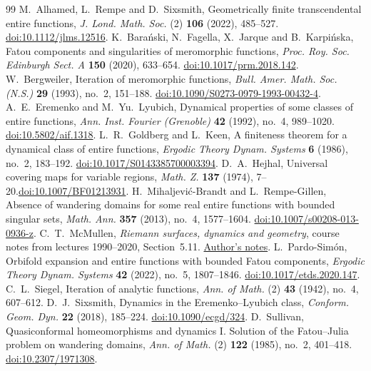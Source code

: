\documentclass[10pt,a4paper]{amsart}
\numberwithin{equation}{section}
\begin{document}
\begin{thebibliography}{99}
 M.~Alhamed, L.~Rempe and D.~Sixsmith, Geometrically finite transcendental entire functions, \emph{J. Lond. Math. Soc.} (2) \textbf{106} (2022), 485--527. \href{https://doi.org/10.1112/jlms.12516}{doi:10.1112/jlms.12516}.
 K.~Bara\'nski, N.~Fagella, X.~Jarque and B.~Karpi\'nska, Fatou components and singularities of meromorphic functions, \emph{Proc. Roy. Soc. Edinburgh Sect. A} \textbf{150} (2020), 633--654. \href{https://doi.org/10.1017/prm.2018.142}{doi:10.1017/prm.2018.142}.
 W.~Bergweiler, Iteration of meromorphic functions, \emph{Bull. Amer. Math. Soc. (N.S.)} \textbf{29} (1993), no.~2, 151--188. \href{https://doi.org/10.1090/S0273-0979-1993-00432-4}{doi:10.1090/S0273-0979-1993-00432-4}.
 A.~E.~Eremenko and M.~Yu.~Lyubich, Dynamical properties of some classes of entire functions, \emph{Ann. Inst. Fourier (Grenoble)} \textbf{42} (1992), no.~4, 989--1020. \href{https://doi.org/10.5802/aif.1318}{doi:10.5802/aif.1318}.
 L.~R.~Goldberg and L.~Keen, A finiteness theorem for a dynamical class of entire functions, \emph{Ergodic Theory Dynam. Systems} \textbf{6} (1986), no.~2, 183--192. \href{https://doi.org/10.1017/S0143385700003394}{doi:10.1017/S0143385700003394}.
 D.~A.~Hejhal, Universal covering maps for variable regions, \emph{Math. Z.} \textbf{137} (1974), 7--20.\newline \href{https://doi.org/10.1007/BF01213931}{doi:10.1007/BF01213931}.
 H.~Mihaljevi\'c-Brandt and L.~Rempe-Gillen, Absence of wandering domains for some real entire functions with bounded singular sets, \emph{Math. Ann.} \textbf{357} (2013), no.~4, 1577--1604. \href{https://doi.org/10.1007/s00208-013-0936-z}{doi:10.1007/s00208-013-0936-z}.
 C.~T.~McMullen, \emph{Riemann surfaces, dynamics and geometry}, course notes from lectures 1990--2020, Section~5.11. \href{https://people.math.harvard.edu/~ctm/papers/home/text/class/notes/rs/course.pdf}{Author's notes}.
 L.~Pardo-Sim\'on, Orbifold expansion and entire functions with bounded Fatou components, \emph{Ergodic Theory Dynam. Systems} \textbf{42} (2022), no.~5, 1807--1846. \href{https://doi.org/10.1017/etds.2020.147}{doi:10.1017/etds.2020.147}.
 C.~L.~Siegel, Iteration of analytic functions, \emph{Ann. of Math.} (2) \textbf{43} (1942), no.~4, 607--612.
 D.~J.~Sixsmith, Dynamics in the Eremenko--Lyubich class, \emph{Conform. Geom. Dyn.} \textbf{22} (2018), 185--224. \href{https://doi.org/10.1090/ecgd/324}{doi:10.1090/ecgd/324}.
 D.~Sullivan, Quasiconformal homeomorphisms and dynamics I. Solution of the Fatou--Julia problem on wandering domains, \emph{Ann. of Math.} (2) \textbf{122} (1985), no.~2, 401--418. \href{https://doi.org/10.2307/1971308}{doi:10.2307/1971308}.
\end{thebibliography}
\end{document}
